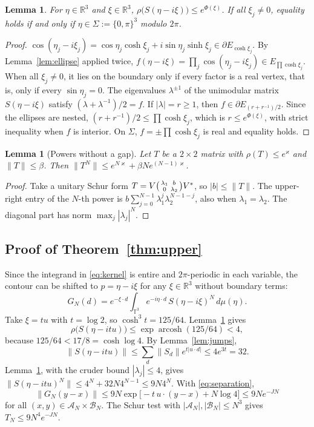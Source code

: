 \documentclass[11pt]{amsart}
\newtheorem{lemma}[theorem]{Lemma}
\theoremstyle{definition}
\theoremstyle{remark}
\newcommand{\R}{\mathbb{R}}
\newcommand{\T}{\mathbb{T}}
\newcommand{\cA}{\mathcal{A}}
\newcommand{\cB}{\mathcal{B}}
\newcommand{\arcosh}{\operatorname{arcosh}}
\begin{document}
\begin{lemma}\label{lem:specrad}
For $\eta\in\R^3$ and $\xi\in\R^3$,
$\rho\bigl(S(\eta-i\xi)\bigr)\le e^{\Phi(\xi)}$.  If all $\xi_j\ne0$, equality
holds if and only if $\eta\in\Sigma:=\{0,\pi\}^3$ modulo $2\pi$.
\end{lemma}

\begin{proof}
$\cos(\eta_j-i\xi_j)=\cos\eta_j\cosh\xi_j+i\sin\eta_j\sinh\xi_j\in\partial E_{\cosh\xi_j}$.
By Lemma~\ref{lem:ellipse} applied twice,
$f(\eta-i\xi)=\prod_j\cos(\eta_j-i\xi_j)\in E_{\prod\cosh\xi_j}$.  When all
$\xi_j\ne0$, it lies on the boundary only if every factor is a real vertex,
that is, only if every $\sin\eta_j=0$.  The eigenvalues $\lambda^{\pm1}$ of
the unimodular matrix $S(\eta-i\xi)$ satisfy $(\lambda+\lambda^{-1})/2=f$.
If $|\lambda|=r\ge1$, then $f\in\partial E_{(r+r^{-1})/2}$.  Since the
ellipses are nested, $(r+r^{-1})/2\le\prod\cosh\xi_j$, which is
$r\le e^{\Phi(\xi)}$, with strict inequality when $f$ is interior.  On
$\Sigma$, $f=\pm\prod\cosh\xi_j$ is real and equality holds.
\end{proof}

\begin{lemma}[Powers without a gap]\label{lem:schur}
Let $T$ be a $2\times2$ matrix with $\rho(T)\le e^{\varkappa}$ and
$\|T\|\le\beta$.  Then $\|T^N\|\le e^{N\varkappa}+\beta Ne^{(N-1)\varkappa}$.
\end{lemma}

\begin{proof}
Take a unitary Schur form $T=V\begin{psmallmatrix}\lambda_1&b\\0&\lambda_2\end{psmallmatrix}V^*$,
so $|b|\le\|T\|$.  The upper-right entry of the $N$-th power is
$b\sum_{j=0}^{N-1}\lambda_1^j\lambda_2^{N-1-j}$, also when
$\lambda_1=\lambda_2$.  The diagonal part has norm
$\max_j|\lambda_j|^N$.
\end{proof}

\subsection{Proof of Theorem~\ref{thm:upper}}
Since the integrand in \eqref{eq:kernel} is entire and $2\pi$-periodic in
each variable, the contour can be shifted to $p=\eta-i\xi$ for any
$\xi\in\R^3$ without boundary terms:
\begin{equation}\label{eq:tilt}
G_N(d)=e^{-\xi\cdot d}\int_{\T^3}e^{-i\eta\cdot d}\,S(\eta-i\xi)^N\,d\mu(\eta).
\end{equation}
Take $\xi=tu$ with $t=\log2$, so $\cosh^3t=125/64$.  Lemma~\ref{lem:specrad}
gives
\[
\rho\bigl(S(\eta-itu)\bigr)\le\exp\arcosh(125/64)<4,
\]
because $125/64<17/8=\cosh\log4$.  By Lemma~\ref{lem:jumps},
\[
\|S(\eta-itu)\|\le\sum_d\|S_d\|e^{t|u\cdot d|}\le4e^{3t}=32 .
\]
Lemma~\ref{lem:schur}, with the cruder bound $|\lambda_j|\le4$, gives
$\|S(\eta-itu)^N\|\le4^N+32N4^{N-1}\le9N4^N$.  With
\eqref{eq:separation},
\[
\|G_N(y-x)\|\le9N\exp\bigl[-t\,u\cdot(y-x)+N\log4\bigr]\le9Ne^{-JN}
\]
for all $(x,y)\in\cA_N\times\cB_N$.  The Schur test with $|\cA_N|,|\cB_N|\le N^3$
gives $T_N\le9N^4e^{-JN}$.
\end{document}

